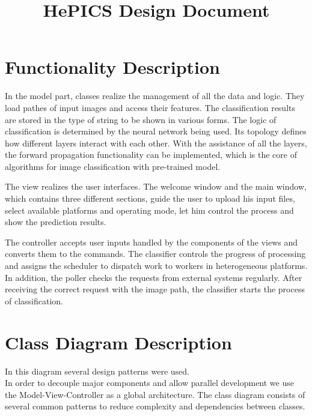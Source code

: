 \documentclass[parskip=full]{scrartcl}
\title{HePICS Design Document}
\begin{document}
\maketitle
\thispagestyle{empty}
\pagebreak





\tableofcontents
\pagebreak





\section {Functionality Description}

In the model part, classes realize the management of all the data and logic. They load pathes of input images and access their features. The classification results are stored in the type of string to be shown in various forms. The logic of classification is determined by the neural network being used. Its topology defines how different layers interact with each other. With the assistance of all the layers, the forward propagation functionality can be implemented, which is the core of algorithms for image classification with pre-trained model.

The view realizes the user interfaces. The welcome window and the main window, which contains three different sections, guide the user to upload his input files, select available platforms and operating mode, let him control the process and show the prediction results. 

The controller accepts user inputs handled by the components of the views and converts them to the commands. The classifier controls the progress of processing and assigns the scheduler to dispatch work to workers in heterogeneous platforms. In addition, the poller checks the requests from external systems regularly. After receiving the correct request with the image path, the classifier starts the process of classification.



\section {Class Diagram Description}

In this diagram several design patterns were used.\\
In order to decouple  major components and allow parallel development we use the Model-View-Controller as a global architecture.
The class diagram consists of several common patterns to reduce complexity and dependencies between classes.
\end{document}
